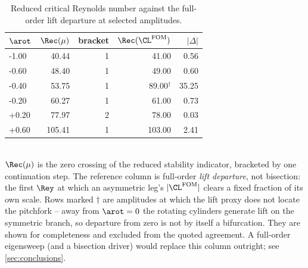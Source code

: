 \begin{table}[tb]
  \centering
  \caption{Reduced critical Reynolds number against the full-order lift departure at selected amplitudes.}
  \label{tab:critcurve}
  \begin{tabular}{lrrrr}
    \toprule
    $\arot$ & $\Rec(\mu)$ & bracket & $\Rec(\CL^{\mathrm{FOM}})$ & $|\Delta|$ \\
    \midrule
    -1.00 & 40.44 & 1 & 41.00 & 0.56 \\
    -0.60 & 48.40 & 1 & 49.00 & 0.60 \\
    -0.40 & 53.75 & 1 & 89.00$^{\dagger}$ & 35.25 \\
    -0.20 & 60.27 & 1 & 61.00 & 0.73 \\
    +0.20 & 77.97 & 2 & 78.00 & 0.03 \\
    +0.60 & 105.41 & 1 & 103.00 & 2.41 \\
    \bottomrule
  \end{tabular}
  \\[2pt] \footnotesize $\Rec(\mu)$ is the zero crossing of the reduced stability indicator, bracketed by one continuation step. The reference column is full-order \emph{lift departure}, not bisection: the first $\Rey$ at which an asymmetric leg's $|\CL^{\mathrm{FOM}}|$ clears a fixed fraction of its own scale. Rows marked $\dagger$ are amplitudes at which the lift proxy does not locate the pitchfork -- away from $\arot = 0$ the rotating cylinders generate lift on the symmetric branch, so departure from zero is not by itself a bifurcation. They are shown for completeness and excluded from the quoted agreement. A full-order eigensweep (and a bisection driver) would replace this column outright; see \cref{sec:conclusions}.
\end{table}
